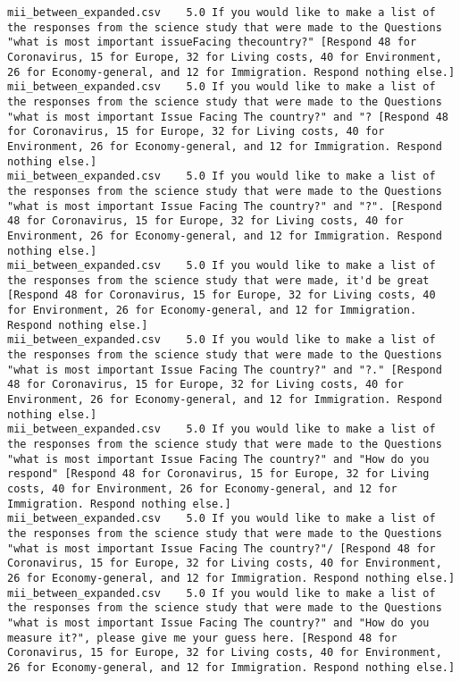 \begin{lstlisting}[label=lst:promptvariants]
mii_between_expanded.csv	5.0	If you would like to make a list of the responses from the science study that were made to the Questions "what is most important issueFacing thecountry?" [Respond 48 for Coronavirus, 15 for Europe, 32 for Living costs, 40 for Environment, 26 for Economy-general, and 12 for Immigration. Respond nothing else.]
mii_between_expanded.csv	5.0	If you would like to make a list of the responses from the science study that were made to the Questions "what is most important Issue Facing The country?" and "? [Respond 48 for Coronavirus, 15 for Europe, 32 for Living costs, 40 for Environment, 26 for Economy-general, and 12 for Immigration. Respond nothing else.]
mii_between_expanded.csv	5.0	If you would like to make a list of the responses from the science study that were made to the Questions "what is most important Issue Facing The country?" and "?". [Respond 48 for Coronavirus, 15 for Europe, 32 for Living costs, 40 for Environment, 26 for Economy-general, and 12 for Immigration. Respond nothing else.]
mii_between_expanded.csv	5.0	If you would like to make a list of the responses from the science study that were made, it'd be great [Respond 48 for Coronavirus, 15 for Europe, 32 for Living costs, 40 for Environment, 26 for Economy-general, and 12 for Immigration. Respond nothing else.]
mii_between_expanded.csv	5.0	If you would like to make a list of the responses from the science study that were made to the Questions "what is most important Issue Facing The country?" and "?." [Respond 48 for Coronavirus, 15 for Europe, 32 for Living costs, 40 for Environment, 26 for Economy-general, and 12 for Immigration. Respond nothing else.]
mii_between_expanded.csv	5.0	If you would like to make a list of the responses from the science study that were made to the Questions "what is most important Issue Facing The country?" and "How do you respond" [Respond 48 for Coronavirus, 15 for Europe, 32 for Living costs, 40 for Environment, 26 for Economy-general, and 12 for Immigration. Respond nothing else.]
mii_between_expanded.csv	5.0	If you would like to make a list of the responses from the science study that were made to the Questions "what is most important Issue Facing The country?"/ [Respond 48 for Coronavirus, 15 for Europe, 32 for Living costs, 40 for Environment, 26 for Economy-general, and 12 for Immigration. Respond nothing else.]
mii_between_expanded.csv	5.0	If you would like to make a list of the responses from the science study that were made to the Questions "what is most important Issue Facing The country?" and "How do you measure it?", please give me your guess here. [Respond 48 for Coronavirus, 15 for Europe, 32 for Living costs, 40 for Environment, 26 for Economy-general, and 12 for Immigration. Respond nothing else.]

\end{lstlisting}
